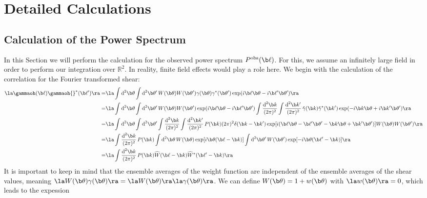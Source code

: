 \section{Detailed Calculations}
\subsection{Calculation of the Power Spectrum}
In this Section we will perform the calculation for the observed power spectrum  $P^{\text{obs}}(\b \ell)$. For this, we assume an infinitely large field in order to perform our integration over $\mathbb{R}^2$. In reality, finite field effects would play a role here. We begin with the calculation of the correlation for the Fourier transformed shear:
\begin{align}
\la \gammaoh(\b \ell) \gammaoh {}^*(\b \ell')\ra = & \la\int\text{d}^2\b \theta\int\text{d}^2\b \theta'\,W(\b \theta)W(\b \theta')\gamma(\b \theta)\gamma^*(\b \theta')\exp(i\b \ell\b \theta-i\b \ell'\b \theta')\ra\nonumber\\
 = & \la\int\text{d}^2\b \theta\int\text{d}^2\b \theta'\,W(\b \theta)W(\b \theta')\exp(i\b \ell\b \theta-i\b \ell'\b \theta') \int \frac{\text{d}^2\b k}{(2\pi)^2}\int \frac{\text{d}^2\b k'}{(2\pi)^2}\, \hat{\gamma}(\b k)\hat{\gamma}^*(\b k')\exp(-i\b k\b \theta+i\b k'\b \theta')\ra \nonumber\\
= & \la \int \text{d}^2\b \theta \int \text{d}^2\b \theta' \int \frac{\text{d}^2\b k}{(2\pi)^2} \int \frac{\text{d}^2\b k'}{(2\pi)^2}\, P(\b k)(2\pi)^2 \delta(\b k-\b k') \exp[i(\b \ell\b \theta-\b \ell'\b \theta'-\b k\b \theta+\b k'\b \theta')]W(\b \theta)W(\b \theta')\ra \nonumber\\
  = & \la \int \frac{\text{d}^2\b k}{(2\pi)^2} \, P(\b k) \int \text{d}^2\b \theta\, W(\b \theta)\exp[i\b \theta(\b \ell-\b k)]\int \text{d}^2\b \theta'\, W(\b \theta') \exp[-i\b \theta(\b \ell'-\b k)] \ra \nonumber\\
  = & \la \int\frac{\text{d}^2 \b k}{(2\pi)^2} \, P(\b k)\widehat{W}(\b \ell-\b k)\widehat{W}^* (\b \ell'-\b k)\ra
\end{align}
It is important to keep in mind that the ensemble averages of the weight function are independent of the ensemble averages of the shear values, meaning $\la W(\b \theta)\gamma(\b \theta)\ra = \la W(\b \theta)\ra \la \gamma(\b \theta)\ra$. We can define $W(\b \theta)=1+w(\b\theta)$ with $\la w(\b \theta)\ra = 0$, which leads to the expession
